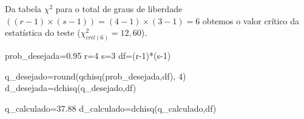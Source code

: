 \documentclass[
]{book}
\newenvironment{Shaded}{\begin{snugshade}}{\end{snugshade}}
\newcommand{\DecValTok}[1]{\textcolor[rgb]{0.00,0.00,0.81}{#1}}
\newcommand{\FloatTok}[1]{\textcolor[rgb]{0.00,0.00,0.81}{#1}}
\newcommand{\FunctionTok}[1]{\textcolor[rgb]{0.00,0.00,0.00}{#1}}
\newcommand{\NormalTok}[1]{#1}
\newcommand{\OtherTok}[1]{\textcolor[rgb]{0.56,0.35,0.01}{#1}}
\newcommand{\SpecialCharTok}[1]{\textcolor[rgb]{0.00,0.00,0.00}{#1}}
\begin{document}
\hfill\break

Da tabela \(\chi^{2}\) para o total de graus de liberdade \(((r-1)\times(s-1))=(4-1)\times(3-1)=6\) obtemos o valor crítico da estatística do teste (\(\chi^{2}_{crit(6)}=12,60\)).

\hfill\break

\begin{Shaded}
\begin{Highlighting}[]
\NormalTok{prob\_desejada}\OtherTok{=}\FloatTok{0.95}
\NormalTok{r}\OtherTok{=}\DecValTok{4}
\NormalTok{s}\OtherTok{=}\DecValTok{3}
\NormalTok{df}\OtherTok{=}\NormalTok{(r}\DecValTok{{-}1}\NormalTok{)}\SpecialCharTok{*}\NormalTok{(s}\DecValTok{{-}1}\NormalTok{)}

\NormalTok{q\_desejado}\OtherTok{=}\FunctionTok{round}\NormalTok{(}\FunctionTok{qchisq}\NormalTok{(prob\_desejada,df), }\DecValTok{4}\NormalTok{)}
\NormalTok{d\_desejada}\OtherTok{=}\FunctionTok{dchisq}\NormalTok{(q\_desejado,df)}


\NormalTok{q\_calculado}\OtherTok{=}\FloatTok{37.88}
\NormalTok{d\_calculado}\OtherTok{=}\FunctionTok{dchisq}\NormalTok{(q\_calculado,df)}



\end{Highlighting}
\end{Shaded}
\end{document}
